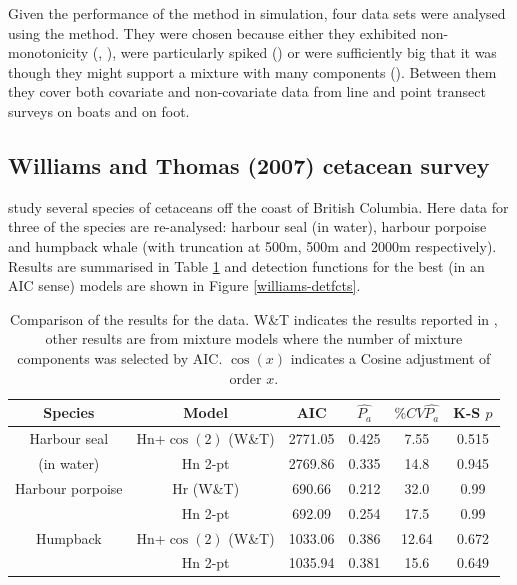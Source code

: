Given the performance of the method in simulation, four data sets were analysed using the method. They were chosen because either they exhibited non-monotonicity (\cite{williams}, \cite{pike}), were particularly spiked (\cite{ants}) or were sufficiently big that it was though they might support a mixture with many components (\cite{amakihi}). Between them they cover both covariate and non-covariate data from line and point transect surveys on boats and on foot.

\subsection{Williams and Thomas (2007) cetacean survey}

 study several species of cetaceans off the coast of British Columbia. Here data for three of the species are re-analysed: harbour seal (in water), harbour porpoise and humpback whale (with truncation at 500m, 500m and 2000m respectively). Results are summarised in Table \ref{williams-table} and detection functions for the best (in an AIC sense) models are shown in Figure \ref{williams-detfcts}.

\begin{table}
\centering
\begin{tabular}{c c c c c c}
Species & Model & AIC & $\hat{P_a}$ & $\% CV \hat{P_a}$ & K-S $p$\\
\hline
Harbour seal & Hn+$\cos(2)$ (W\&T) & 2771.05 & 0.425 & 7.55 & 0.515\\
(in water) & Hn 2-pt  & 2769.86 & 0.335 & 14.8 & 0.945\\
Harbour porpoise & Hr (W\&T) & 690.66 & 0.212 & 32.0 & 0.99\\
 & Hn 2-pt & 692.09 & 0.254 & 17.5 & 0.99\\
Humpback & Hn+$\cos(2)$ (W\&T) & 1033.06 & 0.386 & 12.64 & 0.672 \\
 & Hn 2-pt & 1035.94 & 0.381 & 15.6 & 0.649 \\
\end{tabular}
\caption{Comparison of the results for the  data. W\&T indicates the results reported in , other results are from mixture models where the number of mixture components was selected by AIC. $\cos(x)$ indicates a Cosine adjustment of order $x$.}
\label{williams-table}
\end{table}

